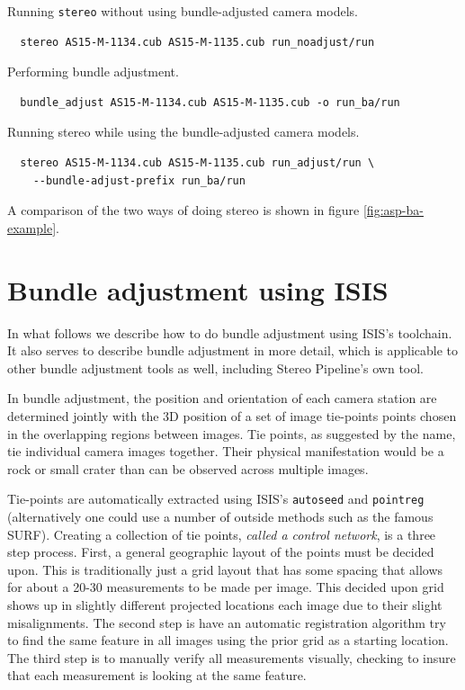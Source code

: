 Running \texttt{stereo} without using bundle-adjusted camera models.
\begin{verbatim}
  stereo AS15-M-1134.cub AS15-M-1135.cub run_noadjust/run
\end{verbatim}

Performing bundle adjustment.
\begin{verbatim}
  bundle_adjust AS15-M-1134.cub AS15-M-1135.cub -o run_ba/run
\end{verbatim}

Running stereo while using the bundle-adjusted camera models.
\begin{verbatim}
  stereo AS15-M-1134.cub AS15-M-1135.cub run_adjust/run \
    --bundle-adjust-prefix run_ba/run
\end{verbatim}

A comparison of the two ways of doing stereo is shown in figure \ref{fig:asp-ba-example}.

\section{Bundle adjustment using ISIS}

In what follows we describe how to do bundle adjustment using
\ac{ISIS}'s toolchain. It also serves to describe bundle adjustment in more
detail, which is applicable to other bundle adjustment tools as well,
including Stereo Pipeline's own tool. 

In bundle adjustment, the position and orientation of each camera
station are determined jointly with the 3D position of a set of image
tie-points points chosen in the overlapping regions between
images. Tie points, as suggested by the name, tie individual camera images
together. Their physical manifestation would be a rock or small crater
than can be observed across multiple images.

Tie-points are automatically extracted using \ac{ISIS}'s
\texttt{autoseed} and \texttt{pointreg} (alternatively one could use a
number of outside methods such as the famous SURF\citep{surf08}).
Creating a collection of tie points, {\it called a control network}, is
a three step process. First, a general geographic layout of the points
must be decided upon. This is traditionally just a grid layout that has
some spacing that allows for about a 20-30 measurements to be made per
image. This decided upon grid shows up in slightly different projected
locations each image due to their slight misalignments. The second step
is have an automatic registration algorithm try to find the same feature
in all images using the prior grid as a starting location. The third
step is to manually verify all measurements visually, checking to insure
that each measurement is looking at the same feature.

